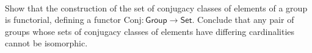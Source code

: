\documentclass[main.tex]{subfiles}
\begin{document}

\paragraph{}
\begin{exercise}
	Show that the construction of the set of conjugacy classes of elements of a
	group is functorial, defining a functor
	\(\mathrm{Conj}\colon\mathsf{Group\to Set}\). Conclude that any pair of
	groups whose sets of conjugacy classes of elements have differing
	cardinalities cannot be isomorphic.
\end{exercise}
\end{document}
